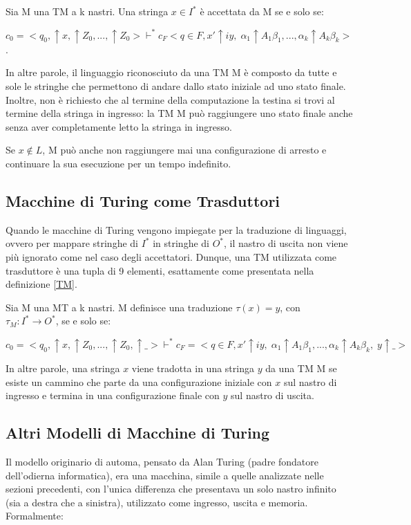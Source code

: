   \begin{definition}
    Sia M una TM a k nastri. Una stringa \(x\in I^*\) è accettata da M se e solo se:

    \(c_0=<q_0, \!\uparrow\! x, \!\uparrow\! Z_0,...,\!\uparrow\! Z_0>\vdash^*c_F<q\in F,x'\!\uparrow\! iy,\; \alpha_1\!\uparrow\! A_1\beta_1,...,\alpha_k\!\uparrow\! A_k\beta_k>\).
  \end{definition}

  In altre parole, il linguaggio riconosciuto da una TM M è composto da tutte e sole le stringhe che permettono di andare dallo stato iniziale ad uno stato finale. Inoltre, non è richiesto che al termine della computazione la testina si trovi al termine della stringa in ingresso: la TM M può raggiungere uno stato finale anche senza aver completamente letto la stringa in ingresso.

  Se \(x\notin L\), M può anche non raggiungere mai una configurazione di arresto e continuare la sua esecuzione per un tempo indefinito.

  \subsection{Macchine di Turing come Trasduttori}
  Quando le macchine di Turing vengono impiegate per la traduzione di linguaggi, ovvero per mappare stringhe di \(I^*\) in stringhe di \(O^*\), il nastro di uscita non viene più ignorato come nel caso degli accettatori. Dunque, una TM utilizzata come trasduttore è una tupla di 9 elementi, esattamente come presentata nella definizione \ref{TM}.

  \begin{definition}
    Sia M una MT a k nastri. M definisce una traduzione \(\tau(x)=y\), con \(\tau_M:I^*\to O^*\), se e solo se:

    \(c_0=<q_0, \!\uparrow\! x, \!\uparrow\! Z_0,...,\!\uparrow\! Z_0, \!\uparrow\! \_>\vdash^* c_F=<q \in F, x'\!\uparrow\! iy,\; \alpha_1\!\uparrow\! A_1\beta_1,..., \alpha_k\!\uparrow\! A_k\beta_k,\; y\!\uparrow\! \_>\)
  \end{definition}

  In altre parole, una stringa \(x\) viene tradotta in una stringa \(y\) da una TM M se esiste un cammino che parte da una configurazione iniziale con \(x\) sul nastro di ingresso e termina in una configurazione finale con \(y\) sul nastro di uscita.

  \subsection{Altri Modelli di Macchine di Turing}
  Il modello originario di automa, pensato da Alan Turing (padre fondatore dell'odierna informatica), era una macchina, simile a quelle analizzate nelle sezioni precedenti, con l'unica differenza che presentava un solo nastro infinito (sia a destra che a sinistra), utilizzato come ingresso, uscita e memoria. Formalmente:

